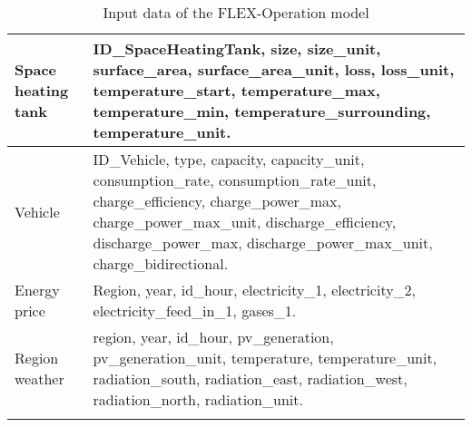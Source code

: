 \begin{center}
\begin{longtable}{ | p{} | p{} | }
            \hline 
            Space heating tank & ID\_SpaceHeatingTank, size, size\_unit, surface\_area, surface\_area\_unit, loss, loss\_unit, temperature\_start, temperature\_max, temperature\_min, temperature\_surrounding, temperature\_unit. \\
            \hline 
            Vehicle & ID\_Vehicle, type, capacity, capacity\_unit, consumption\_rate, consumption\_rate\_unit, charge\_efficiency, charge\_power\_max, charge\_power\_max\_unit, discharge\_efficiency, discharge\_power\_max, discharge\_power\_max\_unit, charge\_bidirectional. \\
            \hline 
            Energy price & Region, year, id\_hour, electricity\_1, electricity\_2, electricity\_feed\_in\_1, gases\_1. \\
            \hline 
            Region weather & region, year, id\_hour, pv\_generation, pv\_generation\_unit, temperature, temperature\_unit, radiation\_south, radiation\_east, radiation\_west, radiation\_north, radiation\_unit. \\
            \hline 
        \caption{Input data of the FLEX-Operation model}
        \label{tab:inputdata}
    \end{longtable}
\end{center}